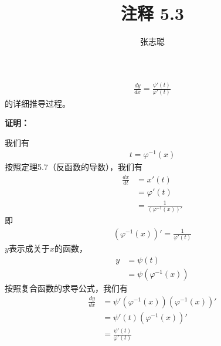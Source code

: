 \documentclass{article}
\begin{document}
\title{注释 5.3}
\author{张志聪}
\maketitle
\begin{zremark}
  \begin{align*}
    \frac{dy}{dx} = \frac{\psi'(t)}{\varphi'(t)}
  \end{align*}
  的详细推导过程。
\end{zremark}

\textbf{证明：}

我们有
\begin{align*}
  t = \varphi^{-1}(x)
\end{align*}
按照定理5.7（反函数的导数），我们有
\begin{align*}
  \frac{dx}{dt} & = x'(t)                        \\
                & = \varphi'(t)                  \\
                & = \frac{1}{(\varphi^{-1}(x))'}
\end{align*}
即
\begin{align*}
  (\varphi^{-1}(x))' = \frac{1}{\varphi'(t)}
\end{align*}
$y$表示成关于$x$的函数，
\begin{align*}
  y & = \psi(t)               \\
    & = \psi(\varphi^{-1}(x))
\end{align*}
按照复合函数的求导公式，我们有
\begin{align*}
  \frac{dy}{dx}
   & = \psi'(\varphi^{-1}(x))(\varphi^{-1}(x))' \\
   & = \psi'(t)(\varphi^{-1}(x))'               \\
   & = \frac{\psi'(t)}{\varphi'(t)}
\end{align*}
\end{document}
